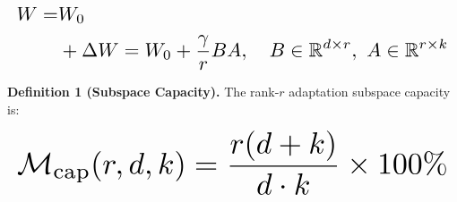 \documentclass[11pt,a4paper]{article}
\begin{document}
\begin{equation}
\resizebox{\columnwidth}{!}{$\displaystyle
\begin{aligned}
W = & W_0 \\
& + \Delta W = W_0 + \frac{\gamma}{r}BA, \quad B \in \mathbb{R}^{d \times r},\ A \in \mathbb{R}^{r \times k}
\end{aligned}
$}
\end{equation}



























\textbf{Definition 1 (Subspace Capacity).} The rank-$r$ adaptation subspace capacity is:



























\begin{equation}
\resizebox{\columnwidth}{!}{$\displaystyle
\begin{aligned}
\mathcal{M}_{\text{cap}}(r, d, k) = \frac{r(d + k)}{d \cdot k} \times 100\%
\end{aligned}
$}
\end{equation}
\end{document}
